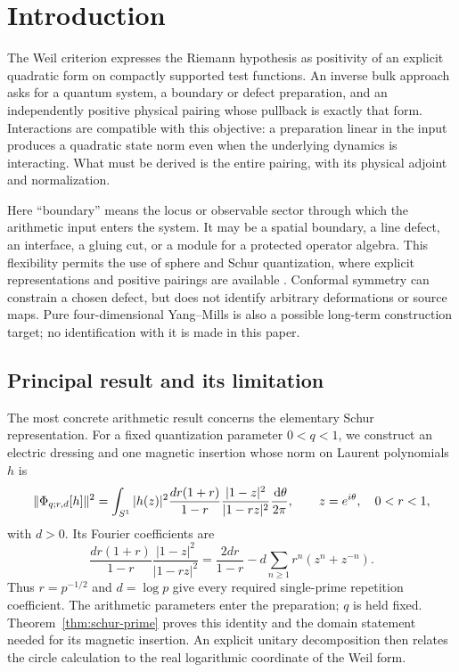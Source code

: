 \section{Introduction}\label{sec:intro}
The Weil criterion expresses the Riemann hypothesis as positivity of an
explicit quadratic form on compactly supported test functions. An inverse
bulk approach asks for a quantum system, a boundary or defect preparation,
and an independently positive physical pairing whose pullback is exactly
that form. Interactions are compatible with this objective: a preparation
linear in the input produces a quadratic state norm even when the
underlying dynamics is interacting. What must be derived is the entire
pairing, with its physical adjoint and normalization.

Here ``boundary'' means the locus or observable sector through which
the arithmetic input enters the system. It may be a spatial boundary,
a line defect, an interface, a gluing cut, or a module for a protected
operator algebra. This flexibility permits the use of sphere and Schur
quantization, where explicit representations and positive pairings are
available \cite{Sphere,Schur,RG}. Conformal symmetry can constrain a chosen
defect, but does not identify arbitrary deformations or source maps.
Pure four-dimensional Yang--Mills is also a possible long-term construction
target; no identification with it is made in this paper.

\clearpage
\subsection{Principal result and its limitation}
The most concrete arithmetic result concerns the elementary Schur
representation. For a fixed quantization parameter $0<q<1$, we construct
an electric dressing and one magnetic insertion whose norm on Laurent
polynomials $h$ is
\begin{equation}\label{eq:intro-norm}
 \lVert \Phi_{q;r,d}[h]\rVert^2
 =\int_{S^1}|h(z)|^2
 \frac{dr(1+r)}{1-r}\frac{|1-z|^2}{|1-rz|^2}\frac{\,\mathrm d\theta}{2\pi},
 \qquad z=e^{i\theta},\quad 0<r<1,
\end{equation}
with $d>0$. Its Fourier coefficients are
\begin{equation}\label{eq:intro-coeff}
 \frac{dr(1+r)}{1-r}\frac{|1-z|^2}{|1-rz|^2}
 =\frac{2dr}{1-r}-d\sum_{n\geq1}r^n(z^n+z^{-n}).
\end{equation}
Thus $r=p^{-1/2}$ and $d=\log p$ give every required single-prime
repetition coefficient. The arithmetic parameters enter the preparation;
$q$ is held fixed. Theorem~\ref{thm:schur-prime} proves this identity and
the domain statement needed for its magnetic insertion. An explicit
unitary decomposition then relates the circle calculation to the real
logarithmic coordinate of the Weil form.

